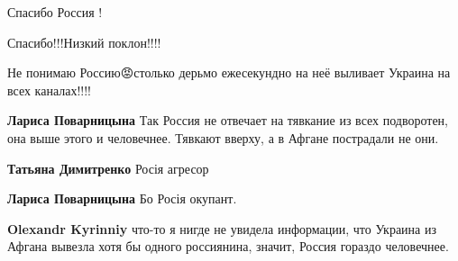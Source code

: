 \begin{itemize}
 
Спасибо Россия !

 
Спасибо!!!Низкий поклон!!!!

 
Не понимаю Россию😡столько дерьмо ежесекундно на неё выливает Украина на всех каналах!!!!

\begin{itemize}
 
\textbf{Лариса Поварницына} Так Россия не отвечает на тявкание из всех подворотен, она выше этого и человечнее.
Тявкают вверху, а в Афгане пострадали не они.

 
\textbf{Татьяна Димитренко} Росія агресор

 
\textbf{Лариса Поварницына} Бо Росія окупант.

 
\textbf{Olexandr Kyrinniy} что-то я нигде не увидела информации, что Украина из Афгана вывезла хотя бы одного россиянина, значит, Россия гораздо человечнее.
\end{itemize}

\end{itemize}

